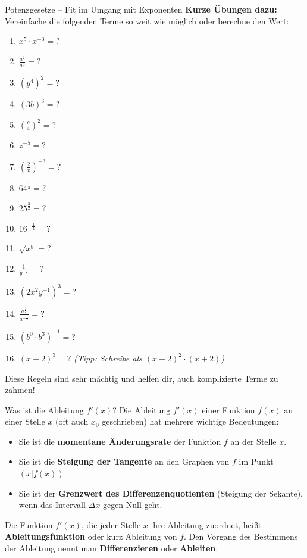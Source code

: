 \begin{erinnerungsboxumgebung}{Potenzgesetze – Fit im Umgang mit Exponenten}
\vspace{0.5em}
\textbf{Kurze Übungen dazu:}
Vereinfache die folgenden Terme so weit wie möglich oder berechne den Wert:
\begin{multicols}{3}
\begin{enumerate}[label=(\alph*)]
    \item $x^5 \cdot x^{-3} = ?$
    \item $\frac{a^2}{a^6} = ?$
    \item $(y^4)^2 = ?$
    \item $(3b)^3 = ?$
    \item $\left(\frac{c}{4}\right)^2 = ?$
    \item $z^{-5} = ?$
    \item $\left(\frac{2}{x}\right)^{-3} = ?$
    \item $64^{\frac{1}{3}} = ?$
    \item $25^{\frac{3}{2}} = ?$
    \item $16^{-\frac{1}{4}} = ?$
    \item $\sqrt{x^8} = ?$
    \item $\frac{1}{y^{-2}} = ?$
    \item $(2x^2y^{-1})^3 = ?$
    \item $\frac{a^{\frac{1}{2}}}{a^{-\frac{1}{2}}} = ?$
    \item $(b^0 \cdot b^3)^{-1} = ?$
    \item $(x+2)^3 = ?$ \textit{(Tipp: Schreibe als $(x+2)^2 \cdot (x+2)$)}
\end{enumerate}
\end{multicols}
Diese Regeln sind sehr mächtig und helfen dir, auch komplizierte Terme zu zähmen!
\end{erinnerungsboxumgebung}


\begin{merksatzumgebung}{Was ist die Ableitung $f'(x)$?}
Die Ableitung $f'(x)$ einer Funktion $f(x)$ an einer Stelle $x$ (oft auch $x_0$ geschrieben) hat mehrere wichtige Bedeutungen:
\begin{itemize}
    \item Sie ist die \textbf{momentane Änderungsrate} der Funktion $f$ an der Stelle $x$.
    \item Sie ist die \textbf{Steigung der Tangente} an den Graphen von $f$ im Punkt $(x|f(x))$.
    \item Sie ist der \textbf{Grenzwert des Differenzenquotienten} (Steigung der Sekante), wenn das Intervall $\Delta x$ gegen Null geht.
\end{itemize}
Die Funktion $f'(x)$, die jeder Stelle $x$ ihre Ableitung zuordnet, heißt \textbf{Ableitungsfunktion} oder kurz Ableitung von $f$. Den Vorgang des Bestimmens der Ableitung nennt man \textbf{Differenzieren} oder \textbf{Ableiten}.
\end{merksatzumgebung}


